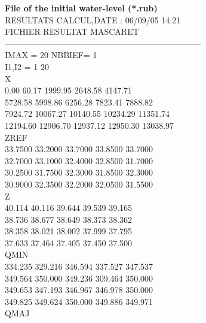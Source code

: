 \documentclass[a4paper,12pt]{article}
\begin{document}
\vspace{0.5cm}
\textbf{File of the initial water-level (*.rub)}\\
\vspace{0.5cm}
RESULTATS CALCUL,DATE :  06/09/05 14:21\\
FICHIER RESULTAT MASCARET \\                                              
----------------------------------------------------------------------- \\
 IMAX  =   20 NBBIEF=    1\\
 I1,I2 =    1   20\\
 X\\
         0.00        60.17      1999.95      2648.58      4147.71\\
      5728.58      5998.86      6256.28      7823.41      7888.82\\
      7924.72     10067.27     10140.55     10234.29     11351.74\\
     12194.60     12906.70     12937.12     12950.30     13038.97\\
 ZREF\\
      33.7500      33.2000      33.7000      33.8500      33.7000\\
      32.7000      33.1000      32.4000      32.8500      31.7000\\
      30.2500      31.7500      32.3000      31.8500      32.3000\\
      30.9000      32.3500      32.2000      32.0500      31.5500\\
 Z\\
       40.114       40.116       39.644       39.539       39.165\\
       38.736       38.677       38.649       38.373       38.362\\
       38.358       38.021       38.002       37.999       37.795\\
       37.633       37.464       37.405       37.450       37.500\\
 QMIN\\
      334.235      329.216      346.594      337.527      347.537\\
      349.564      350.000      349.236      309.464      350.000\\
      349.653      347.193      346.967      346.978      350.000\\
      349.825      349.624      350.000      349.886      349.971\\
 QMAJ\\
\end{document}

